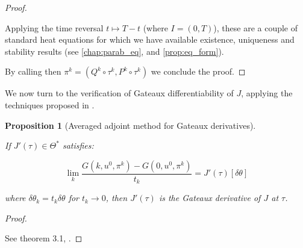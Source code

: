 \documentclass[english,a4paper,9pt,oneside]{scrbook}	%
\theoremstyle{break}
\newtheorem{prop}[equation]{Proposition}
\newenvironment{mproof}[1][\proofname]{%
  \begin{proof}[#1]$ $\par\nobreak\ignorespaces
}{%
  \end{proof}
}
\renewcommand*{\proofname}{Proof}
\theoremstyle{remark}
\newcommand{\id}{\text{Id}}
\newcommand{\te}{\theta}
\newcommand{\Te}{\Theta}
\begin{document}
\begin{mproof}
Applying the time reversal $t\mapsto T -t$ (where $I = (0,T)$), these are a couple of standard heat equations for which we have available existence, uniqueness and stability results (see \cref{chap:parab_eq}, and \cref{prop:eq_form}).

By calling then $\pi^k = (Q^k \circ \tau^k,P^k \circ \tau^k)$ we conclude the proof.
\end{mproof}

We now turn to the verification of Gateaux differentiability of $J$, applying the techniques proposed in \cite{avg_adj}.

\begin{prop}[Averaged adjoint method for Gateaux derivatives]
\label{prop:adv_adj}

If $J'(\tau) \in \Te^*$ satisfies:

$$\lim_{k}\frac{G(k,u^0,\pi^k)-G(0,u^0,\pi^k)}{t_k}=J'(\tau)[\delta \te]$$

where $\delta\te_k = t_k\delta \te$ for $t_k\rightarrow 0$, then $J'(\tau)$ is the Gateaux derivative of $J$ at $\tau$.

\end{prop}

\begin{mproof}

See theorem 3.1, \cite{avg_adj}.

%
%
%
\end{mproof}
\end{document}
